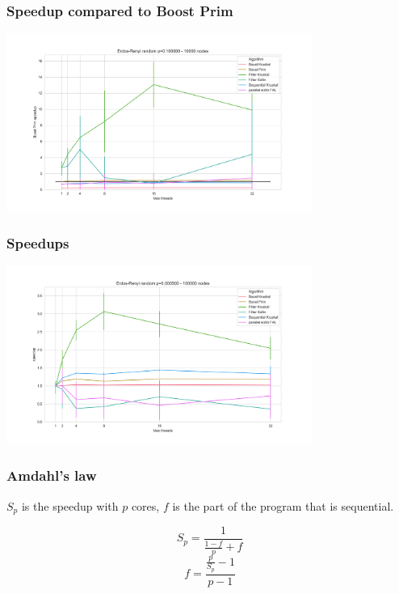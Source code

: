 \documentclass{beamer}
\begin{document}
\begin{frame}
\frametitle{Speedup compared to Boost Prim}
\centering
\includegraphics[width=10cm]{BoostPrimSpeedup3.png}
\end{frame}

\begin{frame}
\frametitle{Speedups}
\centering
\includegraphics[width=10cm]{Speedup2.png}
\end{frame}

\begin{frame}
    \frametitle{Amdahl's law}

	$S_p$ is the speedup with $p$ cores, $f$ is the part of the program that is sequential.

	\[
		S_p = \frac{1}{\frac{1-f}{p} + f}
	\]
	\[
		f = \frac{\frac{p}{S_p} - 1}{p - 1}
	\]

\end{frame}
\end{document}
